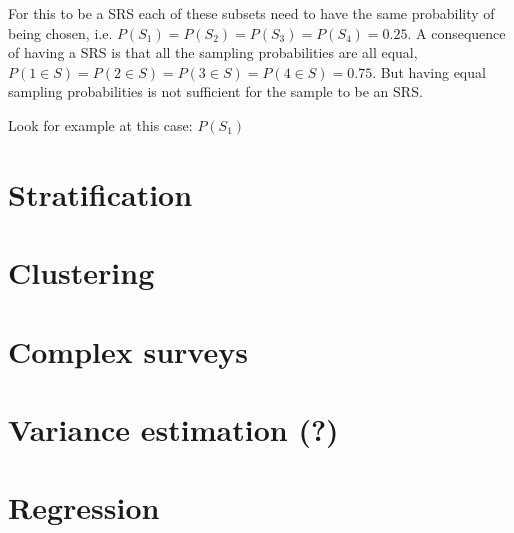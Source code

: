 \documentclass{article}
\begin{document}
For this to be a SRS each of these subsets need to have the same probability of
being chosen, i.e. $P(S_1) = P(S_2) = P(S_3) = P(S_4) = 0.25$. A consequence of
having a SRS is that all the sampling probabilities are all equal, $P(1 \in S) =
P(2 \in S) = P(3 \in S) = P(4 \in S) = 0.75$. But having equal sampling
probabilities is not sufficient for the sample to be an SRS.

Look for example at this case:
$P(S_1)$

\section{Stratification}

\section{Clustering}

\section{Complex surveys}

\section{Variance estimation (?)}

\section{Regression}
\end{document}
